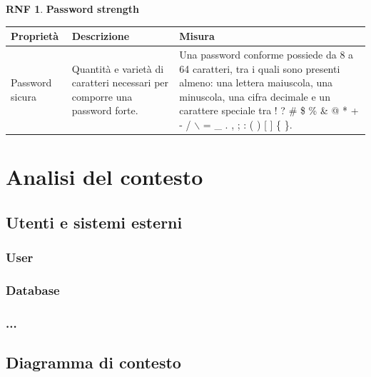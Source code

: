 \documentclass[11pt, a4paper]{article}
\theoremstyle{definition}
\newtheorem{nonfuncreq}{RNF} %
\begin{document}
\begin{nonfuncreq}
    \textbf{Password strength }
    \begin{center}
        \footnotesize
        \begin{tabularx}{\textwidth}{|X||X||X|}
            \hline
            \cellcolor{red!70}Proprietà & \cellcolor{red!70}Descrizione & \cellcolor{red!70}Misura\\
            \hline
            Password sicura & Quantità e varietà di caratteri necessari per comporre una password forte. & Una password conforme possiede da 8 a 64 caratteri, tra i quali sono presenti almeno: una lettera maiuscola, una minuscola, una cifra decimale e un carattere speciale tra ! ? \# \$ \% \& @ * + - / $\backslash$ = \_ . , ; : ( ) [ ] \{ \}.\\
            \hline
        \end{tabularx}
    \end{center}
\end{nonfuncreq}






\newpage
\section{Analisi del contesto}

\subsection{Utenti e sistemi esterni} %
\subsubsection{User}
\subsubsection{Database}
\subsubsection{...}


\subsection{Diagramma di contesto} %
\end{document}
